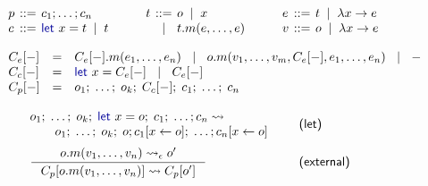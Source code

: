 \documentclass[english,crc]{programming}
\theoremstyle{plain}
\theoremstyle{definition}
\newcommand{\lsep}{\;\;|\;\;}
\newcommand{\kvd}[1]{\textnormal{\textcolor{kvdclr}{\sffamily #1}}}
\newcommand{\narrow}[1]{\hspace{-0.6em}#1\hspace{-0.6em}}
\newcommand{\rname}[1]{{\sffamily(#1)}}
\begin{document}

\begin{figure}
\raggedright
\hspace{0.5em}{\small\sffamily Programs, commands, terms, expressions and values}
\vspace{-0.5em}
\begin{equation*}
\begin{array}{lcl}
p &\narrow{::=}& c_1; \ldots; c_n\\
c &\narrow{::=}& \kvd{let}~x = t \lsep t\\
\end{array}
\qquad
\begin{array}{lcl}
t &\narrow{::=}& o \lsep x \\
  &\narrow{|}& t.m(e, \ldots, e)
\end{array}
\qquad
\begin{array}{lcl}
e &\narrow{::=}& t \lsep \lambda x\rightarrow e\\
v &\narrow{::=}& o \lsep \lambda x\rightarrow e\\
\end{array}
\end{equation*}

\vspace{0.5em}
\hspace{0.5em}{\small\sffamily Evaluation contexts of expressions}
\vspace{-0.5em}
\begin{equation*}
\begin{array}{lcl}
C_e[-] &=& C_e[-].m(e_1, \ldots, e_n) ~\lsep~ o.m(v_1, \ldots, v_{m}, C_e[-], e_1,\ldots , e_n) ~\lsep~ -\\
C_c[-] &=& \kvd{let}~x = C_e[-] ~\lsep~ C_e[-]\\
C_p[-] &=& o_1;\; \ldots;\; o_{k};\; C_c[-];\; c_{1};\; \ldots;\; c_n\\
\end{array}
\end{equation*}

\vspace{0.5em}
\hspace{0.5em}{\small\sffamily Let elimination and member reduction}
\vspace{-0.5em}
\begin{equation*}
\begin{array}{ll}
\hspace{-0.5em}\begin{array}{l}
o_1;\; \ldots;\; o_{k};\; \kvd{let}~x=o;\; c_{1};\; \ldots; c_n \rightsquigarrow\\
\qquad  o_1;\; \ldots;\; o_{k};\; o; c_{1}[x\leftarrow o];\; \ldots; c_n[x\leftarrow o]\end{array} &
\quad\text{\rname{let}}\\[1.2em]
\inference
  {o.m(v_1, \ldots, v_n) \rightsquigarrow_\epsilon o'}
  {C_p[o.m(v_1, \ldots, v_n)] \rightsquigarrow C_p[o']} &
\quad\text{\rname{external}}
\end{array}
\end{equation*}


\end{figure}
\end{document}
